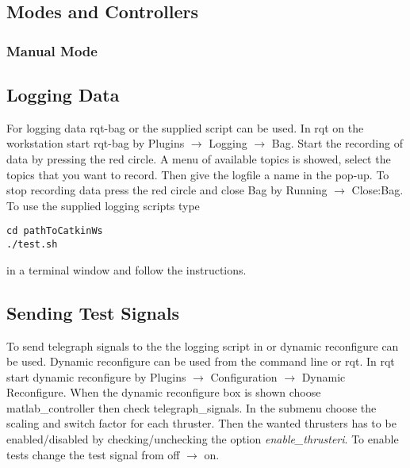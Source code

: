 \subsection{Modes and Controllers}

\subsubsection{Manual Mode}

\subsection{Logging Data}\label{sec:logging}
For logging data rqt-bag or the supplied script can be used. In rqt on the workstation start rqt-bag by Plugins $\rightarrow$ Logging $\rightarrow$ Bag. Start the recording of data by pressing the red circle. A menu of available topics is showed, select the topics that you want to record. Then give the logfile a name in the pop-up.
To stop recording data press the red circle and close Bag by Running $\rightarrow$ Close:Bag. To use the supplied logging scripts type 
\begin{lstlisting}
cd pathToCatkinWs
./test.sh
\end{lstlisting}
in a terminal window and follow the instructions.

\subsection{Sending Test Signals}
To send telegraph signals to the \abbrROV the logging script in  or dynamic reconfigure can be used. Dynamic reconfigure can be used from the command line or rqt. In rqt start dynamic reconfigure by Plugins $\rightarrow$ Configuration $\rightarrow$ Dynamic Reconfigure. When the dynamic reconfigure box is shown choose matlab\_controller then check telegraph\_signals. In the submenu choose the scaling and switch factor for each thruster. Then the wanted thrusters has to be enabled/disabled by checking/unchecking the option \textit{enable\_thrusteri}. To enable tests change the test signal from off $\rightarrow$ on.    

